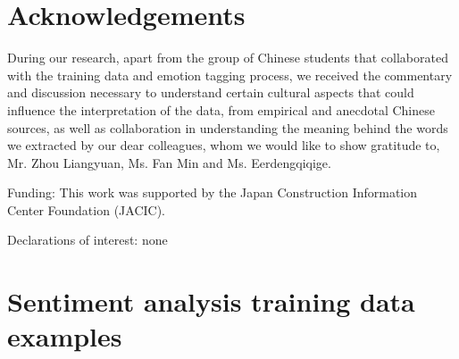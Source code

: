 \documentclass[review]{elsarticle}
\begin{document}
\section*{Acknowledgements}

During our research, apart from the group of Chinese students that collaborated with the training data and emotion tagging process, we received the commentary and discussion necessary to understand certain
cultural aspects that could influence the interpretation of the data, from empirical and anecdotal Chinese sources, as well as collaboration in understanding the meaning behind the words we extracted by our dear colleagues, whom we would like to show gratitude to, Mr. Zhou Liangyuan, Ms. Fan Min and Ms. Eerdengqiqige.

\medskip

Funding: This work was supported by the Japan Construction Information Center Foundation (JACIC).

\medskip

Declarations of interest: none

\clearpage




\clearpage

\appendixpage
\appendix

\section{Sentiment analysis training data examples}
\end{document}
